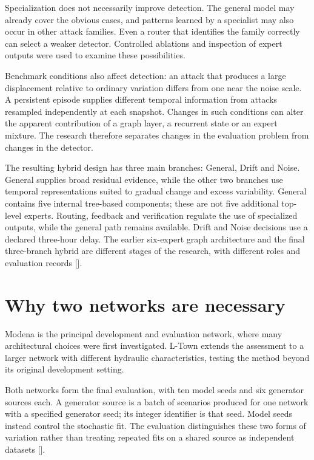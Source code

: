 Specialization does not necessarily improve detection. The general model may already cover the obvious cases, and patterns learned by a specialist may also occur in other attack families. Even a router that identifies the family correctly can select a weaker detector. Controlled ablations and inspection of expert outputs were used to examine these possibilities.

Benchmark conditions also affect detection: an attack that produces a large displacement relative to ordinary variation differs from one near the noise scale. A persistent episode supplies different temporal information from attacks resampled independently at each snapshot. Changes in such conditions can alter the apparent contribution of a graph layer, a recurrent state or an expert mixture. The research therefore separates changes in the evaluation problem from changes in the detector.

The resulting hybrid design has three main branches: General, Drift and Noise. General supplies broad residual evidence, while the other two branches use temporal representations suited to gradual change and excess variability. General contains five internal tree-based components; these are not five additional top-level experts. Routing, feedback and verification regulate the use of specialized outputs, while the general path remains available. Drift and Noise decisions use a declared three-hour delay. The earlier six-expert graph architecture and the final three-branch hybrid are different stages of the research, with different roles and evaluation records [].

\section{Why two networks are necessary}
Modena is the principal development and evaluation network, where many architectural choices were first investigated. L-Town extends the assessment to a larger network with different hydraulic characteristics, testing the method beyond its original development setting.

Both networks form the final evaluation, with ten model seeds and six generator sources each. A generator source is a batch of scenarios produced for one network with a specified generator seed; its integer identifier is that seed. Model seeds instead control the stochastic fit. The evaluation distinguishes these two forms of variation rather than treating repeated fits on a shared source as independent datasets [].

